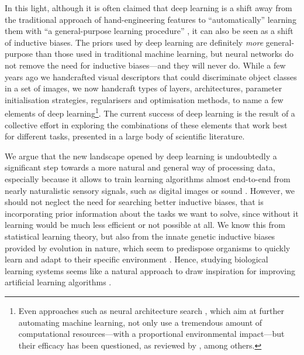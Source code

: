 {In this light, although it is often claimed that deep learning is a shift away from the traditional approach of hand-engineering features to ``automatically'' learning them with ``a general-purpose learning procedure'' \citep{lecun2015deeplearningnature}, it can also be seen as a shift of inductive biases. The priors used by deep learning are definitely \textit{more} general-purpose than those used in traditional machine learning, but neural networks do not remove the need for inductive biases---and they will never do. While a few years ago we handcrafted visual descriptors that could discriminate object classes in a set of images, we now handcraft types of layers, architectures, parameter initialisation strategies, regularisers and optimisation methods, to name a few elements of deep learning\footnote{Even approaches such as neural architecture search \citep{zoph2016nas}, which aim at further automating machine learning, not only use a tremendous amount of computational resources---with a proportional environmental impact---but their efficacy has been questioned, as reviewed by \citet{gencoglu2019hark}, among others.}. The current success of deep learning is the result of a collective effort in exploring the combinations of these elements that work best for different tasks, presented in a large body of scientific literature.

We argue that the new landscape opened by deep learning is undoubtedly a significant step towards a more natural and general way of processing data, especially because it allows to train learning algorithms almost end-to-end from nearly naturalistic sensory signals, such as digital images or sound \citep{saxe2020dlandneuroscience}. However, we should not neglect the need for searching better inductive biases, that is incorporating prior information about the tasks we want to solve, since without it learning would be much less efficient or not possible at all. We know this from statistical learning theory, but also from the innate genetic inductive biases provided by evolution in nature, which seem to predispose organisms to quickly learn and adapt to their specific environment \citep{zador2019purelearning}. Hence, studying biological learning systems seems like a natural approach to draw inspiration for improving artificial learning algorithms \citep{hassabis2017aiandneuroscience, nayebi2017bioconstraints, lindsay2018bioconstraints, malhotra2020bioconstraints}.

}
